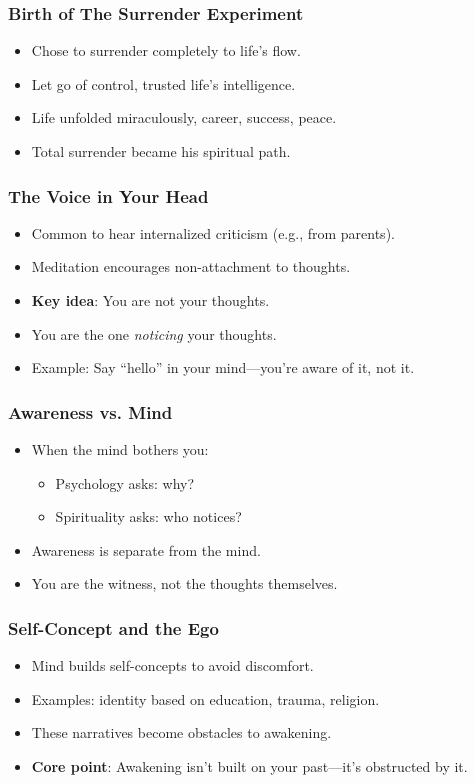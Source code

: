\begin{frame}[fragile]\frametitle{Birth of The Surrender Experiment}
    \begin{itemize}
        \item Chose to surrender completely to life’s flow.
        \item Let go of control, trusted life’s intelligence.
        \item Life unfolded miraculously, career, success, peace.
        \item Total surrender became his spiritual path.
    \end{itemize}
\end{frame}


\begin{frame}[fragile]\frametitle{The Voice in Your Head}
  \begin{itemize}
    \item Common to hear internalized criticism (e.g., from parents).
    \item Meditation encourages non-attachment to thoughts.
    \item \textbf{Key idea}: You are not your thoughts.
    \item You are the one \textit{noticing} your thoughts.
    \item Example: Say “hello” in your mind---you’re aware of it, not it.
  \end{itemize}
\end{frame}

\begin{frame}[fragile]\frametitle{Awareness vs. Mind}
  \begin{itemize}
    \item When the mind bothers you:
    \begin{itemize}
      \item Psychology asks: why?
      \item Spirituality asks: who notices?
    \end{itemize}
    \item Awareness is separate from the mind.
    \item You are the witness, not the thoughts themselves.
  \end{itemize}
\end{frame}

\begin{frame}[fragile]\frametitle{Self-Concept and the Ego}
  \begin{itemize}
    \item Mind builds self-concepts to avoid discomfort.
    \item Examples: identity based on education, trauma, religion.
    \item These narratives become obstacles to awakening.
    \item \textbf{Core point}: Awakening isn't built on your past---it’s obstructed by it.
  \end{itemize}
\end{frame}

